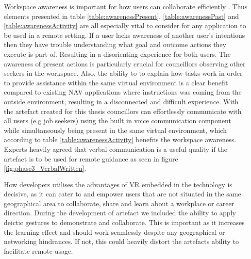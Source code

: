 Workspace awareness is important for how users can collaborate efficiently \cite{gutwin1996workspace}. Thus elements presented in table \ref{table:awarenessPresent}, \ref{table:awarenessPast}  and \ref{table:awarenessActivity} are all especially vital to consider for any application to be used in a remote setting. If a user lacks awareness of another user's intentions then they have trouble understanding what goal and outcome actions they execute is part of. Resulting in a disorienting experience for both users. The awareness of present actions is particularly crucial for councillors observing other seekers in the workspace. Also, the ability to to explain how tasks work in order to provide assistance within the same virtual environment is a clear benefit compared to existing NAV applications where instructions was coming from the outside environment, resulting in a disconnected and difficult experience. With the artefact created for this thesis councillors can effortlessly communicate with all users (e.g job seekers) using the built in voice communication component while simultaneously being present in the same virtual environment, which according to table \ref{table:awarenessActivity} benefits the workspace awareness. Experts heavily agreed that verbal communication is a useful quality if the artefact is to be used for remote guidance as seen in figure \ref{fig:phase3_VerbalWritten}.         




How developers utilises the advantages of VR embedded in the technology is decisive, as it can cater to and empower users that are not situated in the same geographical area to collaborate, share and learn about a workplace or career direction. During the development of artefact we included the ability to apply deictic gestures to demonstrate and collaborate. This is important as it increases the learning effect \cite{stahl2006computer} and should work seamlessly despite any geographical or networking hindrances. If not, this could heavily distort the artefacts ability to facilitate remote usage.               


